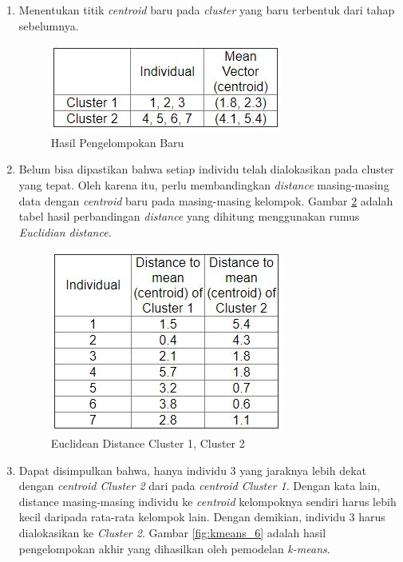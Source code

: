 \documentclass[a4paper,twoside]{article}
\begin{document}
\begin{enumerate}
\begin{enumerate}
\item Menentukan titik \textit{centroid} baru pada \textit{cluster} yang baru terbentuk dari tahap sebelumnya.

\begin{figure}[H]
	\centering
	\includegraphics[scale=0.9]{kmeans_4}
	\caption{Hasil Pengelompokan Baru}
	\label{fig:kmeans_4}
\end{figure}

\item Belum bisa dipastikan bahwa setiap individu telah dialokasikan pada cluster yang tepat. Oleh karena itu, perlu membandingkan \textit{distance} masing-masing data dengan \textit{centroid} baru pada masing-masing kelompok. Gambar \ref{fig:kmeans_5} adalah tabel hasil perbandingan \textit{distance} yang dihitung menggunakan rumus \textit{Euclidian distance}.

\begin{figure}[H]
	\centering
	\includegraphics[scale=0.9]{kmeans_5}
	\caption{Euclidean Distance Cluster 1, Cluster 2}
	\label{fig:kmeans_5}
\end{figure}

\item Dapat disimpulkan bahwa, hanya individu 3 yang jaraknya lebih dekat dengan \textit{centroid Cluster 2} dari pada \textit{centroid Cluster 1}. Dengan kata lain, distance masing-masing individu ke \textit{centroid} kelompoknya sendiri harus lebih kecil daripada rata-rata kelompok lain. Dengan demikian, individu 3 harus dialokasikan ke \textit{Cluster 2}. Gambar \ref{fig:kmeans_6} adalah hasil pengelompokan akhir yang dihasilkan oleh pemodelan \textit{k-means}.


\end{enumerate}
\end{enumerate}
\end{document}
